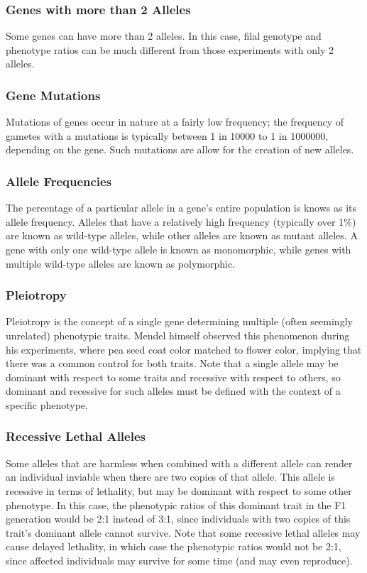\documentclass[12pt,titlepage]{article}
\begin{document}
        \subsubsection{Genes with more than 2 Alleles}
          Some genes can have more than 2 alleles. In this case, filal genotype and phenotype ratios can be much different from those experiments with only
          2 alleles.

        \subsubsection{Gene Mutations}
          Mutations of genes occur in nature at a fairly low frequency; the frequency of gametes with a mutations is typically between 1 in 10000 to 1 in 1000000,
          depending on the gene. Such mutations are allow for the creation of new alleles.

        \subsubsection{Allele Frequencies}
          The percentage of a particular allele in a gene's entire population is knows as its allele frequency. Alleles that have a relatively high frequency
          (typically over 1\%) are known as wild-type alleles, while other alleles are known as mutant alleles. A gene with only one wild-type allele is known
          as monomorphic, while genes with multiple wild-type alleles are known as polymorphic.

        \subsubsection{Pleiotropy}
          Pleiotropy is the concept of a single gene determining multiple (often seemingly unrelated) phenotypic traits. Mendel himself observed this phenomenon
          during his experiments, where pea seed coat color matched to flower color, implying that there was a common control for both traits. Note that a single
          allele may be dominant with respect to some traits and recessive with respect to others, so dominant and recessive for such alleles must be defined
          with the context of a specific phenotype.

        \subsubsection{Recessive Lethal Alleles}
          Some alleles that are harmless when combined with a different allele can render an individual inviable when there are two copies of that allele. This
          allele is recessive in terms of lethality, but may be dominant with respect to some other phenotype. In this case, the phenotypic ratios of this dominant
          trait in the F1 generation would be 2:1 instead of 3:1, since individuals with two copies of this trait's dominant allele cannot survive. Note that some
          recessive lethal alleles may cause delayed lethality, in which case the phenotypic ratios would not be 2:1, since affected individuals may survive for
          some time (and may even reproduce).
\end{document}
